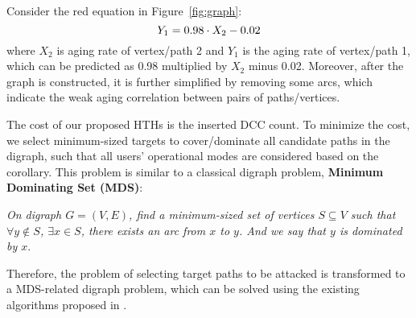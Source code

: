 Consider the red equation in Figure~\ref{fig:graph}:
\begin{equation}
	\centering
	\fontsize{8}{8} \selectfont
	Y_{1} = 0.98 \cdot X_{2} - 0.02
\end{equation}
where $X_{2}$ is aging rate of vertex/path 2 and $Y_{1}$ is the aging rate of vertex/path 1, which can be predicted as 0.98 multiplied by $X_{2}$ minus 0.02.
Moreover, after the graph is constructed, it is further simplified by removing some arcs, which indicate the weak aging correlation between pairs of paths/vertices.

The cost of our proposed HTHs is the inserted DCC count. To minimize the cost, we select minimum-sized targets to cover/dominate all candidate paths in the digraph, such that all users' operational modes are considered based on the corollary. This problem is similar to a classical digraph problem, \textbf{Minimum Dominating Set (MDS)}:

\textit{On digraph $G = (V, E)$, find a minimum-sized set of vertices $S \subseteq V$ such that $\forall y \notin S$, $\exists x \in S$, there exists an arc from $x$ to $y$. And we say that $y$ is dominated by $x$}.

Therefore, the problem of selecting target paths to be attacked is transformed to a MDS-related digraph problem, which can be solved using the existing algorithms proposed in \cite{ore1962theory}\cite{natarajan1978optimum}.


